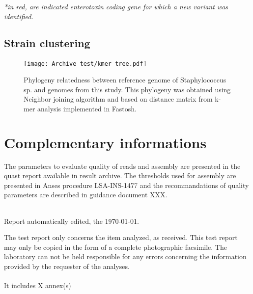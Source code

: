 \documentclass[a4paper]{article}
\begin{document}
\small \textit{*in red, are indicated enterotoxin coding gene for which a new variant was identified.}


\clearpage

\subsection{Strain clustering}

\begin{figure}[H]
\begin{center}
 \texttt{[image: Archive\_test/kmer\_tree.pdf]} %
\end{center}
\caption{Phylogeny relatedness between reference genome of Staphylococcus sp. and genomes from this study. This phylogeny was obtained using Neighbor joining algorithm and based on distance matrix from k-mer analysis implemented in Fastosh.}
\end{figure}

 

\section{Complementary informations}

The parameters to evaluate quality of reads and assembly are presented in the quast report available in result archive. The thresholds used for assembly are presented in Anses procedure LSA-INS-1477 and the recommandations of quality parameters are described in guidance document XXX.\\\\

\begin{flushright}
{Report automatically edited, the \today.}
\end{flushright}


\noindent
The test report only concerns the item analyzed, as received. This test report may only be copied in the form of a complete photographic facsimile. The laboratory can not be held responsible for any errors concerning the information provided by the requester of the analyses. 
\\\\It includes X annex(s)%



 \label{LastPageOf}
\end{document}
